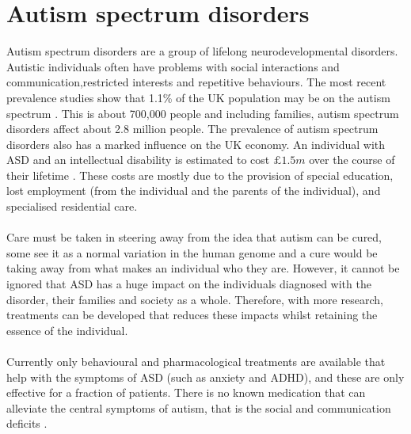 \documentclass{epsrc}
\begin{document}
\section{Autism spectrum disorders}
\noindent
Autism spectrum disorders are a group of lifelong neurodevelopmental disorders. Autistic individuals often have problems with social interactions and communication,restricted interests and repetitive behaviours. The most recent prevalence studies show that 1.1\% of the UK population may be on the autism spectrum \cite{brugha2012estimating}. This is about 700,000 people and including families, autism spectrum disorders affect about 2.8 million people. The prevalence of autism spectrum disorders also has a marked influence on the UK economy. An individual with ASD and an intellectual disability is estimated to cost $ \pounds 1.5m $ over the course of their lifetime \cite{buescher2014costs}. These costs are mostly due to the provision of special education, lost employment (from the individual and the parents of the individual), and specialised residential care. 
\\\\
Care must be taken in steering away from the idea that autism can be cured, some see it as a normal variation in the human genome and a cure would be taking away from what makes an individual who they are. However, it cannot be ignored that ASD has a huge impact on the individuals diagnosed with the disorder, their families and society as a whole. Therefore, with more research, treatments can be developed that reduces these impacts whilst retaining the essence of the individual.
\\\\
Currently only behavioural and pharmacological treatments are available that help with the symptoms of ASD (such as anxiety and ADHD), and these are only effective for a fraction of patients. There is no known medication that can alleviate the central symptoms of autism, that is the social and communication deficits \cite{buitelaar2003have}.
\\
\end{document}
